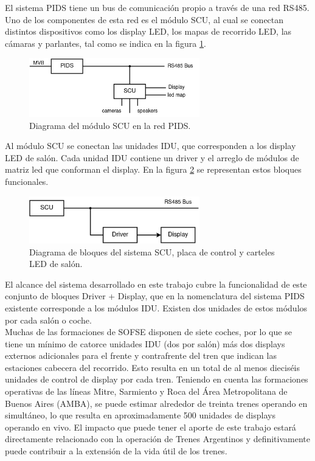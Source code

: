 El sistema PIDS tiene un bus de comunicación propio a través de una red RS485. Uno de los componentes de esta red es el módulo SCU, al cual se conectan distintos dispositivos como los display LED, los mapas de recorrido LED, las cámaras y parlantes, tal como se indica en la figura 	\ref{fig:diagPidsScuDevices}.\\


\begin{figure}[ht]
	\centering
	\includegraphics[width=0.66\textwidth]{./Figures/diagPidsScuDevices.png}
	\caption{Diagrama del módulo SCU en la red PIDS.}
	\label{fig:diagPidsScuDevices}
\end{figure}

Al módulo SCU se conectan las unidades IDU, que corresponden a los display LED de salón. Cada unidad IDU contiene un driver y el arreglo de módulos de matriz led que conforman el display. En la figura \ref{fig:diagScuDriverDisplay} se representan estos bloques funcionales.\\


\begin{figure}[ht]
	\centering
	\includegraphics[width=0.66\textwidth]{./Figures/diagScuDriverDisplay.png}
	\caption{Diagrama de bloques del sistema SCU, placa de control y carteles LED de salón.}
	\label{fig:diagScuDriverDisplay}
\end{figure}

El alcance del sistema desarrollado en este trabajo cubre la funcionalidad de este conjunto de bloques Driver + Display, que en la nomenclatura del sistema PIDS existente corresponde a los módulos IDU. Existen dos unidades de estos módulos por cada salón o coche.\\

Muchas de las formaciones de SOFSE disponen de siete coches, por lo que se tiene un mínimo de catorce unidades IDU (dos por salón) más dos displays externos adicionales para el frente y contrafrente del tren que indican las estaciones cabecera del recorrido. Esto resulta en un total de al menos dieciséis unidades de control de display por cada tren. Teniendo en cuenta las formaciones operativas de las líneas Mitre, Sarmiento y Roca del Área Metropolitana de Buenos Aires (AMBA), se puede estimar alrededor de treinta trenes operando en simultáneo, lo que resulta en aproximadamente 500 unidades de displays operando en vivo. El impacto que puede tener el aporte de este trabajo estará directamente relacionado con la operación de Trenes Argentinos y definitivamente puede contribuir a la extensión de la vida útil de los trenes.\\

